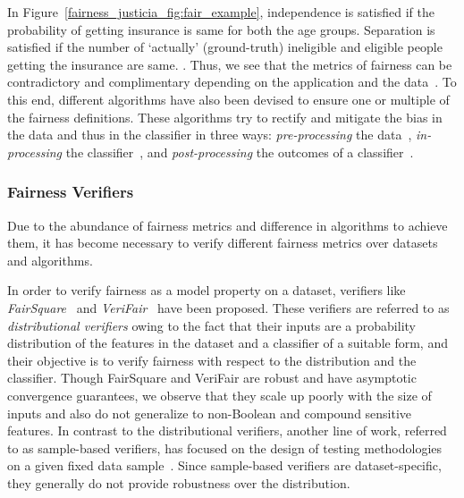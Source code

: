 In Figure~\ref{fairness_justicia_fig:fair_example}, independence is satisfied if the probability of getting insurance is same for both the age groups. Separation is satisfied if the number of `actually' (ground-truth) ineligible and eligible people getting the insurance are same. . Thus, we see that the metrics of fairness can be contradictory and complimentary depending on the application and the data~\cite{corbett2018measure}. To this end, different algorithms have also been devised to ensure one or multiple of the fairness definitions. These algorithms try to rectify and mitigate the bias in the data and thus in the classifier in three ways: \textit{pre-processing} the data~\cite{kamiran2012data,zemel2013learning,calmon2017optimized}, \textit{in-processing} the classifier~\cite{zhang2018mitigating}, and \textit{post-processing} the outcomes of a classifier~\cite{kamiran2012decision,hardt2016equality}.

\subsubsection{Fairness Verifiers} Due to the abundance of fairness metrics and difference in algorithms to achieve them, it has become necessary to verify different fairness metrics over datasets and algorithms. 

In order to verify fairness as a model property on a dataset, verifiers like \textit{FairSquare}~\cite{albarghouthi2017fairsquare} and \textit{VeriFair}~\cite{bastani2019probabilistic} have been proposed. 
These verifiers are referred to as {\em distributional verifiers} owing to the fact that their inputs are a probability  distribution of the features in the dataset and a classifier of a suitable form, and their objective is to verify fairness with respect to the distribution and the classifier.
Though FairSquare and VeriFair are robust and have asymptotic convergence guarantees, we observe that they scale up poorly with the size of inputs and also do not generalize to non-Boolean and compound sensitive features.
In contrast to the distributional verifiers, another line of work, referred to as sample-based verifiers, has focused on the design of testing methodologies  on a given fixed data sample~\cite{galhotra2017fairness,aif360-oct-2018}. 
Since sample-based verifiers are dataset-specific, they generally do not provide robustness over the distribution.


